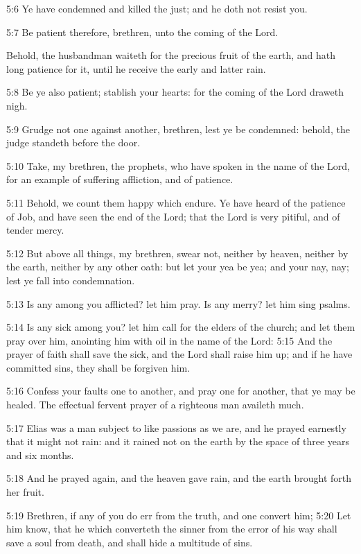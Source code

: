 5:6 Ye have condemned and killed the just; and he doth not resist you.

5:7 Be patient therefore, brethren, unto the coming of the Lord.

Behold, the husbandman waiteth for the precious fruit of the earth,
and hath long patience for it, until he receive the early and latter
rain.

5:8 Be ye also patient; stablish your hearts: for the coming of the
Lord draweth nigh.

5:9 Grudge not one against another, brethren, lest ye be condemned:
behold, the judge standeth before the door.

5:10 Take, my brethren, the prophets, who have spoken in the name of
the Lord, for an example of suffering affliction, and of patience.

5:11 Behold, we count them happy which endure. Ye have heard of the
patience of Job, and have seen the end of the Lord; that the Lord is
very pitiful, and of tender mercy.

5:12 But above all things, my brethren, swear not, neither by heaven,
neither by the earth, neither by any other oath: but let your yea be
yea; and your nay, nay; lest ye fall into condemnation.

5:13 Is any among you afflicted? let him pray. Is any merry? let him
sing psalms.

5:14 Is any sick among you? let him call for the elders of the church;
and let them pray over him, anointing him with oil in the name of the
Lord: 5:15 And the prayer of faith shall save the sick, and the Lord
shall raise him up; and if he have committed sins, they shall be
forgiven him.

5:16 Confess your faults one to another, and pray one for another,
that ye may be healed. The effectual fervent prayer of a righteous man
availeth much.

5:17 Elias was a man subject to like passions as we are, and he prayed
earnestly that it might not rain: and it rained not on the earth by
the space of three years and six months.

5:18 And he prayed again, and the heaven gave rain, and the earth
brought forth her fruit.

5:19 Brethren, if any of you do err from the truth, and one convert
him; 5:20 Let him know, that he which converteth the sinner from the
error of his way shall save a soul from death, and shall hide a
multitude of sins.

